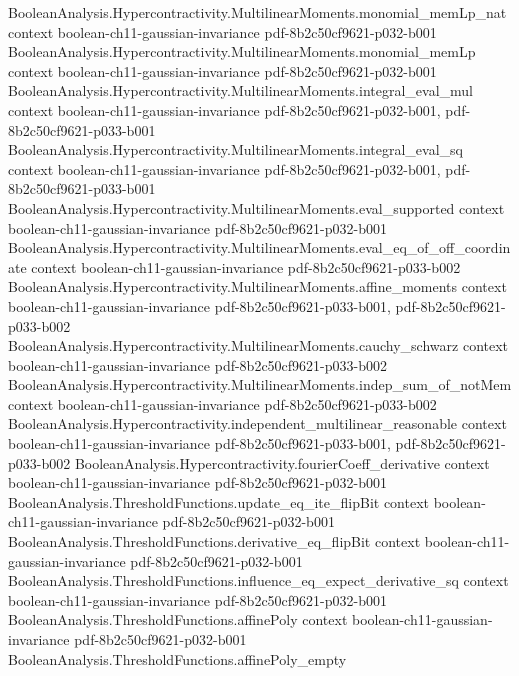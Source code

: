\begin{theorem}
\proofstep
  {BooleanAnalysis.Hypercontractivity.MultilinearMoments.monomial_memLp_nat}
  {context}
  {boolean-ch11-gaussian-invariance}
  {pdf-8b2c50cf9621-p032-b001}
\proofstep
  {BooleanAnalysis.Hypercontractivity.MultilinearMoments.monomial_memLp}
  {context}
  {boolean-ch11-gaussian-invariance}
  {pdf-8b2c50cf9621-p032-b001}
\proofstep
  {BooleanAnalysis.Hypercontractivity.MultilinearMoments.integral_eval_mul}
  {context}
  {boolean-ch11-gaussian-invariance}
  {pdf-8b2c50cf9621-p032-b001,
    pdf-8b2c50cf9621-p033-b001}
\proofstep
  {BooleanAnalysis.Hypercontractivity.MultilinearMoments.integral_eval_sq}
  {context}
  {boolean-ch11-gaussian-invariance}
  {pdf-8b2c50cf9621-p032-b001,
    pdf-8b2c50cf9621-p033-b001}
\proofstep
  {BooleanAnalysis.Hypercontractivity.MultilinearMoments.eval_supported}
  {context}
  {boolean-ch11-gaussian-invariance}
  {pdf-8b2c50cf9621-p032-b001}
\proofstep
  {BooleanAnalysis.Hypercontractivity.MultilinearMoments.eval_eq_of_off_coordinate}
  {context}
  {boolean-ch11-gaussian-invariance}
  {pdf-8b2c50cf9621-p033-b002}
\proofstep
  {BooleanAnalysis.Hypercontractivity.MultilinearMoments.affine_moments}
  {context}
  {boolean-ch11-gaussian-invariance}
  {pdf-8b2c50cf9621-p033-b001,
    pdf-8b2c50cf9621-p033-b002}
\proofstep
  {BooleanAnalysis.Hypercontractivity.MultilinearMoments.cauchy_schwarz}
  {context}
  {boolean-ch11-gaussian-invariance}
  {pdf-8b2c50cf9621-p033-b002}
\proofstep
  {BooleanAnalysis.Hypercontractivity.MultilinearMoments.indep_sum_of_notMem}
  {context}
  {boolean-ch11-gaussian-invariance}
  {pdf-8b2c50cf9621-p033-b002}
\proofstep
  {BooleanAnalysis.Hypercontractivity.independent_multilinear_reasonable}
  {context}
  {boolean-ch11-gaussian-invariance}
  {pdf-8b2c50cf9621-p033-b001,
    pdf-8b2c50cf9621-p033-b002}
\proofstep
  {BooleanAnalysis.Hypercontractivity.fourierCoeff_derivative}
  {context}
  {boolean-ch11-gaussian-invariance}
  {pdf-8b2c50cf9621-p032-b001}
\proofstep
  {BooleanAnalysis.ThresholdFunctions.update_eq_ite_flipBit}
  {context}
  {boolean-ch11-gaussian-invariance}
  {pdf-8b2c50cf9621-p032-b001}
\proofstep
  {BooleanAnalysis.ThresholdFunctions.derivative_eq_flipBit}
  {context}
  {boolean-ch11-gaussian-invariance}
  {pdf-8b2c50cf9621-p032-b001}
\proofstep
  {BooleanAnalysis.ThresholdFunctions.influence_eq_expect_derivative_sq}
  {context}
  {boolean-ch11-gaussian-invariance}
  {pdf-8b2c50cf9621-p032-b001}
\proofstep
  {BooleanAnalysis.ThresholdFunctions.affinePoly}
  {context}
  {boolean-ch11-gaussian-invariance}
  {pdf-8b2c50cf9621-p032-b001}
\proofstep
  {BooleanAnalysis.ThresholdFunctions.affinePoly_empty}

\end{theorem}
